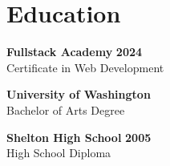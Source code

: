 \documentclass[a4paper,12pt]{article}
\begin{document}
\section*{Education}

\textbf{Fullstack Academy} \hfill \textbf{2024} \\
Certificate in Web Development

\textbf{University of Washington} \\
Bachelor of Arts Degree

\textbf{Shelton High School} \hfill \textbf{2005} \\
High School Diploma
\end{document}
